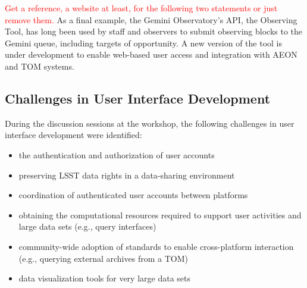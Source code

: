 \textcolor{red}{Get a reference, a website at least, for the following two statements or just remove them.}
As a final example, the Gemini Observatory's  {API}, the Observing Tool, has long been used by staff and observers to submit observing blocks to the Gemini queue, including targets of opportunity.
A new version of the tool is under development to enable web-based user access and integration with  {AEON} and  {TOM} systems.


\subsection{Challenges in User Interface Development}\label{ssec:interfaces_challenges}

During the discussion sessions at the workshop, the following challenges in user interface development were identified:
\begin{itemize}
\item the authentication and authorization of user accounts
\item preserving   LSST data rights in a data-sharing environment 
\item coordination of authenticated user accounts between platforms
\item obtaining the computational resources required to support user activities and large data sets (e.g., query interfaces)
\item community-wide adoption of standards to enable cross-platform interaction (e.g., querying external archives from a  {TOM})
\item data visualization tools for very large data sets
\end{itemize}



